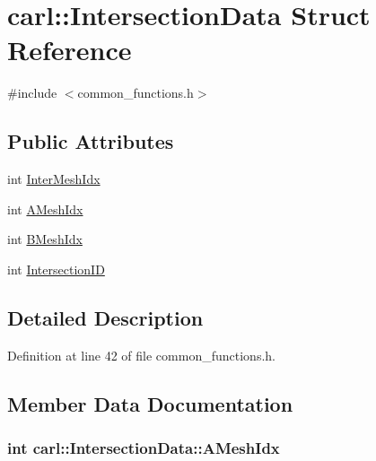 \hypertarget{structcarl_1_1_intersection_data}{}\section{carl\+:\+:Intersection\+Data Struct Reference}
\label{structcarl_1_1_intersection_data}


{\ttfamily \#include $<$common\+\_\+functions.\+h$>$}

\subsection*{Public Attributes}
\begin{DoxyCompactItemize}
\item 
int \hyperlink{structcarl_1_1_intersection_data_a5c47db4bdae8b27a4de3cb4ae6f150ad}{Inter\+Mesh\+Idx}
\item 
int \hyperlink{structcarl_1_1_intersection_data_a247bca076a7c03e74a00392531e8616b}{A\+Mesh\+Idx}
\item 
int \hyperlink{structcarl_1_1_intersection_data_a17a525c08eca43d3e845711ec0d61ecd}{B\+Mesh\+Idx}
\item 
int \hyperlink{structcarl_1_1_intersection_data_af7f0f2efa3bf04a035def30e1c48b830}{Intersection\+I\+D}
\end{DoxyCompactItemize}


\subsection{Detailed Description}


Definition at line 42 of file common\+\_\+functions.\+h.



\subsection{Member Data Documentation}
\hypertarget{structcarl_1_1_intersection_data_a247bca076a7c03e74a00392531e8616b}{}
\subsubsection[{A\+Mesh\+Idx}]{\setlength{\rightskip}{0pt plus 5cm}int carl\+::\+Intersection\+Data\+::\+A\+Mesh\+Idx}\label{structcarl_1_1_intersection_data_a247bca076a7c03e74a00392531e8616b}


